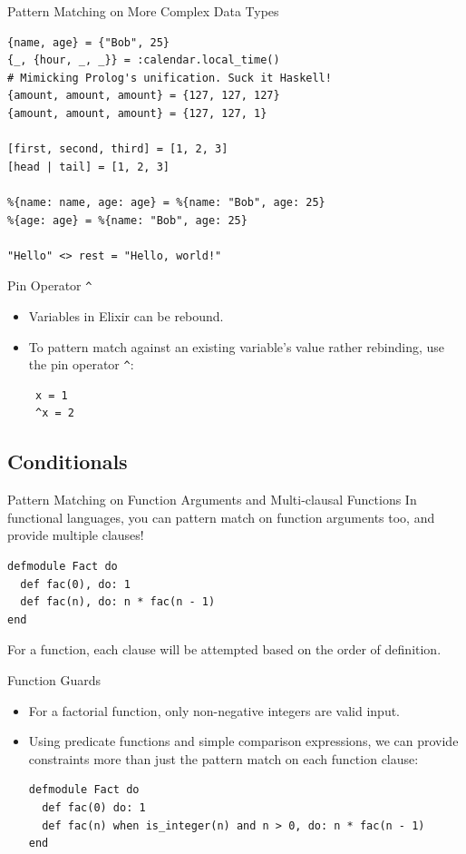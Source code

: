 \documentclass[12pt]{beamer}
\begin{document}
\begin{frame}[fragile]{Pattern Matching on More Complex Data Types}
  \begin{verbatim}
{name, age} = {"Bob", 25}
{_, {hour, _, _}} = :calendar.local_time()
# Mimicking Prolog's unification. Suck it Haskell!
{amount, amount, amount} = {127, 127, 127}
{amount, amount, amount} = {127, 127, 1}

[first, second, third] = [1, 2, 3]
[head | tail] = [1, 2, 3]

%{name: name, age: age} = %{name: "Bob", age: 25}
%{age: age} = %{name: "Bob", age: 25}

"Hello" <> rest = "Hello, world!"
 \end{verbatim}
\end{frame}

\begin{frame}[fragile]{Pin Operator \texttt{^}}
  \begin{itemize}
    \item Variables in Elixir can be rebound.
    \item To pattern match against an existing variable's value rather rebinding, use the pin operator \texttt{^}:
          \begin{verbatim}
 x = 1
 ^x = 2
 \end{verbatim}
  \end{itemize}
\end{frame}

\subsection{Conditionals}
\begin{frame}[fragile]{Pattern Matching on Function Arguments and Multi-clausal Functions}
  In functional languages, you can pattern match on function arguments too, and provide multiple clauses!
  \begin{verbatim}
defmodule Fact do
  def fac(0), do: 1
  def fac(n), do: n * fac(n - 1)
end
 \end{verbatim}
  For a function, each clause will be attempted based on the order of definition.
\end{frame}

\begin{frame}[fragile]{Function Guards}
  \begin{itemize}
    \item For a factorial function, only non-negative integers are valid input.
    \item Using predicate functions and simple comparison expressions, we can provide constraints more than just the pattern match on each function clause:
          \begin{verbatim}
defmodule Fact do
  def fac(0) do: 1
  def fac(n) when is_integer(n) and n > 0, do: n * fac(n - 1)
end
 \end{verbatim}
  \end{itemize}
\end{frame}
\end{document}
